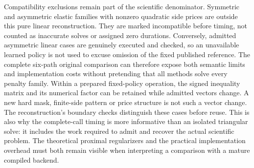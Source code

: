 Compatibility exclusions remain part of the scientific denominator. Symmetric
and asymmetric elastic families with nonzero quadratic side prices are outside
this pure linear reconstruction. They are marked incompatible before timing,
not counted as inaccurate solves or assigned zero durations. Conversely,
admitted asymmetric linear cases are genuinely executed and checked, so an
unavailable learned policy is not used to excuse omission of the fixed published
reference. The complete six-path original comparison can therefore expose
both semantic limits and implementation costs without pretending that all
methods solve every penalty family.
Within a prepared fixed-policy operation, the signed inequality matrix and
its numerical factor can be retained while admitted vectors change. A new
hard mask, finite-side pattern or price structure is not such a vector
change. The reconstruction's boundary checks distinguish these cases before
reuse. This is also why the complete-call timing is more informative than
an isolated triangular solve: it includes the work required to admit and
recover the actual scientific problem. The theoretical proximal regularizers
and the practical implementation overhead must both remain visible when
interpreting a comparison with a mature compiled backend.
